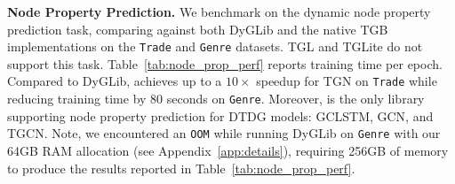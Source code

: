\noindent
\begin{minipage}[t]{0.4\textwidth}  %
\textbf{Node Property Prediction.} We benchmark \name on the dynamic node property prediction task, comparing against both DyGLib and the native TGB implementations on the \texttt{Trade} and \texttt{Genre} datasets. TGL and TGLite do not support this task. Table~\ref{tab:node_prop_perf} reports training time per epoch. Compared to DyGLib, \name achieves up to a $10\times$ speedup for TGN on \texttt{Trade} while reducing training time by 80 seconds on \texttt{Genre}. Moreover, \name is the only library supporting node property prediction for DTDG models: GCLSTM, GCN, and TGCN. Note, we encountered an \small{\texttt{OOM}} while running DyGLib on \texttt{Genre} with our 64GB RAM allocation (see Appendix~\ref{app:details}), requiring 256GB of memory to produce the results reported in Table~\ref{tab:node_prop_perf}.
\end{minipage}%
\hfill
\begin{minipage}[t]{0.57\textwidth}  %
\centering

\label{tab:node_prop_perf}
\end{minipage}

